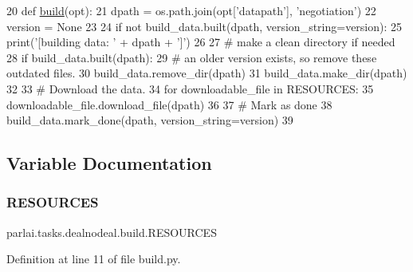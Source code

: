 \begin{DoxyCode}
20 \textcolor{keyword}{def }\hyperlink{namespacedialog__babi__feedback_1_1build_a7a9d289f7493a5ded13c4b7f071b6184}{build}(opt):
21     dpath = os.path.join(opt[\textcolor{stringliteral}{'datapath'}], \textcolor{stringliteral}{'negotiation'})
22     version = \textcolor{keywordtype}{None}
23 
24     \textcolor{keywordflow}{if} \textcolor{keywordflow}{not} build\_data.built(dpath, version\_string=version):
25         print(\textcolor{stringliteral}{'[building data: '} + dpath + \textcolor{stringliteral}{']'})
26 
27         \textcolor{comment}{# make a clean directory if needed}
28         \textcolor{keywordflow}{if} build\_data.built(dpath):
29             \textcolor{comment}{# an older version exists, so remove these outdated files.}
30             build\_data.remove\_dir(dpath)
31         build\_data.make\_dir(dpath)
32 
33         \textcolor{comment}{# Download the data.}
34         \textcolor{keywordflow}{for} downloadable\_file \textcolor{keywordflow}{in} RESOURCES:
35             downloadable\_file.download\_file(dpath)
36 
37         \textcolor{comment}{# Mark as done}
38         build\_data.mark\_done(dpath, version\_string=version)
39 \end{DoxyCode}


\subsection{Variable Documentation}
\mbox{\label{namespaceparlai_1_1tasks_1_1dealnodeal_1_1build_ace9d70121fa551d0c322b96a03a29fcb}} 
\subsubsection{\texorpdfstring{R\+E\+S\+O\+U\+R\+C\+ES}{RESOURCES}}
{\footnotesize\ttfamily parlai.\+tasks.\+dealnodeal.\+build.\+R\+E\+S\+O\+U\+R\+C\+ES}



Definition at line 11 of file build.\+py.

